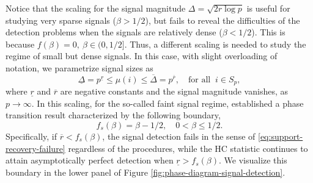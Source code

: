 Notice that the scaling for the signal magnitude $\Delta = \sqrt{2r\log{p}}$ is useful for studying very sparse signals ($\beta>1/2$), but fails to reveal the difficulties of the detection problems when the signals are relatively dense 
($\beta<1/2$).  This is because $f(\beta) = 0,\ \beta\in (0,1/2]$. Thus, a different scaling is needed to study the regime of
small but dense signals.  In this case, with slight overloading of notation, we parametrize signal sizes as 
\begin{equation} \label{eq:signal-size-small} 
    \underline{\Delta} = p^{\underline{r}}
    \le \mu(i) \le
    \overline{\Delta} = p^{\overline{r}}, \quad \text{for all}\;\;i\in S_p,
\end{equation}
where $\underline{r}$ and $\overline{r}$ are {\rm negative} constants and 
the signal magnitude vanishes, as $p\to\infty$.
In this scaling, for the so-called faint signal regime, \citet{cai2011optimal} established a phase 
transition result characterized by the following boundary,
\begin{equation} \label{eq:detection-boundary-small-signals}
    f_s(\beta) = \beta - 1/2, \quad 0 < \beta \le 1/2.
\end{equation} 
Specifically, if $\overline{r}<f_s(\beta)$, the signal detection fails in the sense of \eqref{eq:support-recovery-failure} regardless of the procedures, while the \ac{HC} statistic continues to attain asymptotically perfect detection when $\underline{r}>f_s(\beta)$. 
We visualize this boundary in the lower panel of Figure \ref{fig:phase-diagram-signal-detection}.


